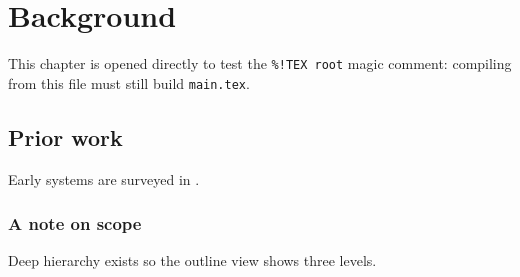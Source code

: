 \section{Background}
\label{sec:background}
This chapter is opened directly to test the \verb|%!TEX root| magic comment:
compiling from this file must still build \verb|main.tex|.

\subsection{Prior work}
\label{sub:prior}
Early systems are surveyed in \cite{knuth1984texbook}.

\subsubsection{A note on scope}
\label{ssub:scope}
Deep hierarchy exists so the outline view shows three levels.
